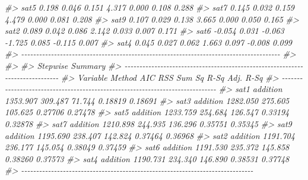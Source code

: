 \documentclass[
]{article}
\newenvironment{Shaded}{\begin{snugshade}}{\end{snugshade}}
\newcommand{\CommentTok}[1]{\textcolor[rgb]{0.56,0.35,0.01}{\textit{#1}}}
\begin{document}
\begin{Shaded}
\begin{Highlighting}[]
\CommentTok{\#\textgreater{}        sat5     0.198         0.046        0.151     4.317    0.000     0.108    0.288 }
\CommentTok{\#\textgreater{}        sat7     0.145         0.032        0.159     4.479    0.000     0.081    0.208 }
\CommentTok{\#\textgreater{}        sat9     0.107         0.029        0.138     3.665    0.000     0.050    0.165 }
\CommentTok{\#\textgreater{}        sat2     0.089         0.042        0.086     2.142    0.033     0.007    0.171 }
\CommentTok{\#\textgreater{}        sat6    {-}0.054         0.031       {-}0.063    {-}1.725    0.085    {-}0.115    0.007 }
\CommentTok{\#\textgreater{}        sat4     0.045         0.027        0.062     1.663    0.097    {-}0.008    0.099 }
\CommentTok{\#\textgreater{} {-}{-}{-}{-}{-}{-}{-}{-}{-}{-}{-}{-}{-}{-}{-}{-}{-}{-}{-}{-}{-}{-}{-}{-}{-}{-}{-}{-}{-}{-}{-}{-}{-}{-}{-}{-}{-}{-}{-}{-}{-}{-}{-}{-}{-}{-}{-}{-}{-}{-}{-}{-}{-}{-}{-}{-}{-}{-}{-}{-}{-}{-}{-}{-}{-}{-}{-}{-}{-}{-}{-}{-}{-}{-}{-}{-}{-}{-}{-}{-}{-}{-}{-}{-}{-}{-}{-}}
\CommentTok{\#\textgreater{} }
\CommentTok{\#\textgreater{} }
\CommentTok{\#\textgreater{}                                 Stepwise Summary                                }
\CommentTok{\#\textgreater{} {-}{-}{-}{-}{-}{-}{-}{-}{-}{-}{-}{-}{-}{-}{-}{-}{-}{-}{-}{-}{-}{-}{-}{-}{-}{-}{-}{-}{-}{-}{-}{-}{-}{-}{-}{-}{-}{-}{-}{-}{-}{-}{-}{-}{-}{-}{-}{-}{-}{-}{-}{-}{-}{-}{-}{-}{-}{-}{-}{-}{-}{-}{-}{-}{-}{-}{-}{-}{-}{-}{-}{-}{-}{-}{-}{-}{-}{-}}
\CommentTok{\#\textgreater{} Variable     Method       AIC         RSS      Sum Sq      R{-}Sq      Adj. R{-}Sq }
\CommentTok{\#\textgreater{} {-}{-}{-}{-}{-}{-}{-}{-}{-}{-}{-}{-}{-}{-}{-}{-}{-}{-}{-}{-}{-}{-}{-}{-}{-}{-}{-}{-}{-}{-}{-}{-}{-}{-}{-}{-}{-}{-}{-}{-}{-}{-}{-}{-}{-}{-}{-}{-}{-}{-}{-}{-}{-}{-}{-}{-}{-}{-}{-}{-}{-}{-}{-}{-}{-}{-}{-}{-}{-}{-}{-}{-}{-}{-}{-}{-}{-}{-}}
\CommentTok{\#\textgreater{} sat1        addition    1353.907    309.487     71.744    0.18819      0.18691 }
\CommentTok{\#\textgreater{} sat3        addition    1282.050    275.605    105.625    0.27706      0.27478 }
\CommentTok{\#\textgreater{} sat5        addition    1233.759    254.684    126.547    0.33194      0.32878 }
\CommentTok{\#\textgreater{} sat7        addition    1210.898    244.935    136.296    0.35751      0.35345 }
\CommentTok{\#\textgreater{} sat9        addition    1195.690    238.407    142.824    0.37464      0.36968 }
\CommentTok{\#\textgreater{} sat2        addition    1191.704    236.177    145.054    0.38049      0.37459 }
\CommentTok{\#\textgreater{} sat6        addition    1191.530    235.372    145.858    0.38260      0.37573 }
\CommentTok{\#\textgreater{} sat4        addition    1190.731    234.340    146.890    0.38531      0.37748 }
\CommentTok{\#\textgreater{} {-}{-}{-}{-}{-}{-}{-}{-}{-}{-}{-}{-}{-}{-}{-}{-}{-}{-}{-}{-}{-}{-}{-}{-}{-}{-}{-}{-}{-}{-}{-}{-}{-}{-}{-}{-}{-}{-}{-}{-}{-}{-}{-}{-}{-}{-}{-}{-}{-}{-}{-}{-}{-}{-}{-}{-}{-}{-}{-}{-}{-}{-}{-}{-}{-}{-}{-}{-}{-}{-}{-}{-}{-}{-}{-}{-}{-}{-}}
\end{Highlighting}
\end{Shaded}
\end{document}
